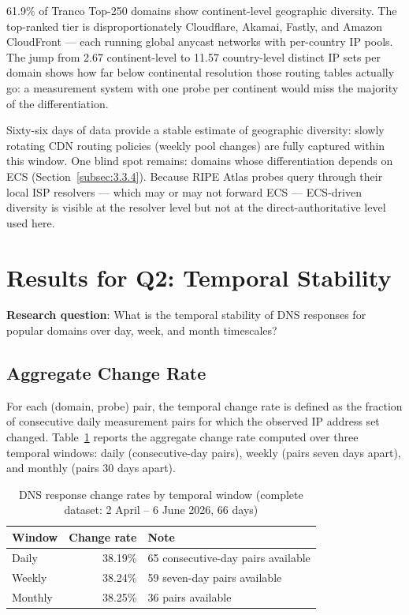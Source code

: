 61.9\% of Tranco Top-250 domains show continent-level geographic diversity. The top-ranked tier is disproportionately Cloudflare, Akamai, Fastly, and Amazon CloudFront --- each running global anycast networks with per-country \ac{IP} pools. The jump from 2.67 continent-level to 11.57 country-level distinct \ac{IP} sets per domain shows how far below continental resolution those routing tables actually go: a measurement system with one probe per continent would miss the majority of the differentiation.

Sixty-six days of data provide a stable estimate of geographic diversity: slowly rotating \ac{CDN} routing policies (weekly pool changes) are fully captured within this window. One blind spot remains: domains whose differentiation depends on \ac{ECS} (Section~\ref{subsec:3.3.4}). Because RIPE Atlas probes query through their local \ac{ISP} resolvers --- which may or may not forward \ac{ECS} --- \ac{ECS}-driven diversity is visible at the resolver level but not at the direct-authoritative level used here.

\bigskip
\section{Results for Q2: Temporal Stability}
\label{sec:4.3}

\textbf{Research question}: What is the temporal stability of DNS responses for popular domains over day, week, and month timescales?

\subsection{Aggregate Change Rate}
\label{subsec:4.3.1}

For each (domain, probe) pair, the temporal change rate is defined as the fraction of consecutive daily measurement pairs for which the observed \ac{IP} address set changed. Table~\ref{tab:4.3} reports the aggregate change rate computed over three temporal windows: daily (consecutive-day pairs), weekly (pairs seven days apart), and monthly (pairs 30 days apart).

\begin{table}[H]
\centering
\small
\begin{tabular}{l r l}
\toprule
\textbf{Window} & \textbf{Change rate} & \textbf{Note} \\
\midrule
Daily   & 38.19\% & 65 consecutive-day pairs available \\
Weekly  & 38.24\% & 59 seven-day pairs available \\
Monthly & 38.25\% & 36 pairs available \\
\bottomrule
\end{tabular}
\caption{\ac{DNS} response change rates by temporal window (complete dataset: 2 April -- 6 June 2026, 66 days)}
\label{tab:4.3}
\end{table}

